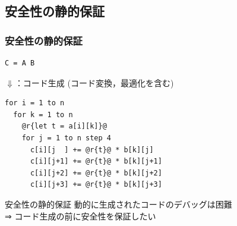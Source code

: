 \documentclass[dvipdfmx,cjk,xcolor=dvipsnames,envcountsect,notheorems,12pt]{beamer}
\theoremstyle{definition}
\begin{document}

\subsection{安全性の静的保証}

\begin{frame}[fragile]
  \frametitle{安全性の静的保証}
\begin{lstlisting}
C = A B
\end{lstlisting}
  \begin{center}
    $\Downarrow$：コード生成 (コード変換，最適化を含む)
  \end{center}
\begin{lstlisting}
for i = 1 to n
  for k = 1 to n
    @r{let t = a[i][k]}@
    for j = 1 to n step 4
      c[i][j  ] += @r{t}@ * b[k][j]
      c[i][j+1] += @r{t}@ * b[k][j+1]
      c[i][j+2] += @r{t}@ * b[k][j+2]
      c[i][j+3] += @r{t}@ * b[k][j+3]
\end{lstlisting}

  \begin{exampleblock}{安全性の静的保証}
    動的に生成されたコードのデバッグは困難\\
    ⇒ コード生成の前に安全性を保証したい
  \end{exampleblock}

\end{frame}
\end{document}
